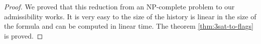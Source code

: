 \begin{proof}
We proved that this reduction from an NP-complete problem to our admissibility works. It is very easy to the size of the history is linear in the size of the formula and can be computed in linear time. The theorem \ref{thm:3sat-to-flags} is proved.


\end{proof}

